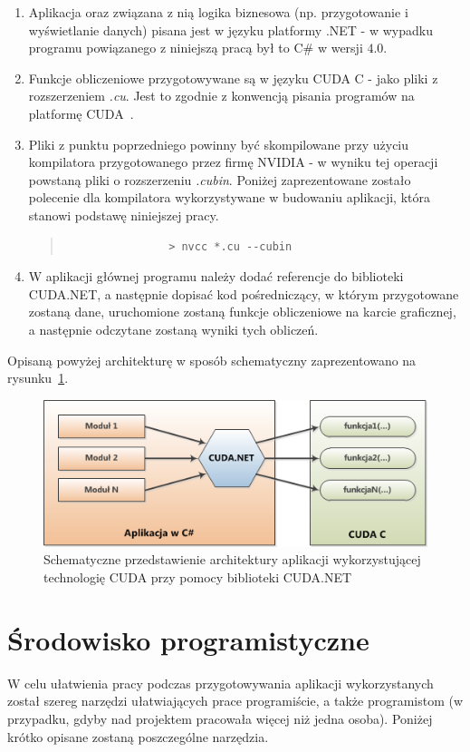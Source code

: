 \begin{enumerate}
	\item Aplikacja oraz związana z nią logika biznesowa (np. przygotowanie i wyświetlanie danych) pisana jest w języku platformy .NET - w wypadku programu powiązanego z niniejszą pracą był to C\# w wersji $4.0$.
	\item Funkcje obliczeniowe przygotowywane są w języku CUDA C - jako pliki z rozszerzeniem \emph{.cu}. Jest to zgodnie z konwencją pisania programów na platformę CUDA~\cite{Cuda:PGuide}.
	\item Pliki z punktu poprzedniego powinny być skompilowane przy użyciu kompilatora przygotowanego przez firmę NVIDIA - w wyniku tej operacji powstaną pliki o rozszerzeniu \emph{.cubin}. Poniżej zaprezentowane zostało polecenie dla kompilatora wykorzystywane w budowaniu aplikacji, która stanowi podstawę niniejszej pracy.
		\begin{quote}
			\begin{verbatim}
				> nvcc *.cu --cubin
			\end{verbatim}
		\end{quote}
	\item W aplikacji głównej programu należy dodać referencje do biblioteki CUDA.NET, a następnie dopisać kod pośredniczący, w którym przygotowane zostaną dane, uruchomione zostaną funkcje obliczeniowe na karcie graficznej, a następnie odczytane zostaną wyniki tych obliczeń.
\end{enumerate}

Opisaną powyżej architekturę w sposób schematyczny zaprezentowano na rysunku~\ref{rys:arch_cuda_net}.

\begin{figure}[ht]
\centering
\includegraphics{figures/04/arch_cuda_net.png}
\caption{Schematyczne przedstawienie architektury aplikacji wykorzystującej technologię CUDA przy pomocy biblioteki CUDA.NET}\label{rys:arch_cuda_net}
\end{figure}

\section{Środowisko programistyczne}
W celu ułatwienia pracy podczas przygotowywania aplikacji wykorzystanych został szereg narzędzi ułatwiających prace programiście, a także programistom (w przypadku, gdyby nad projektem pracowała więcej niż jedna osoba). Poniżej krótko opisane zostaną poszczególne narzędzia.

